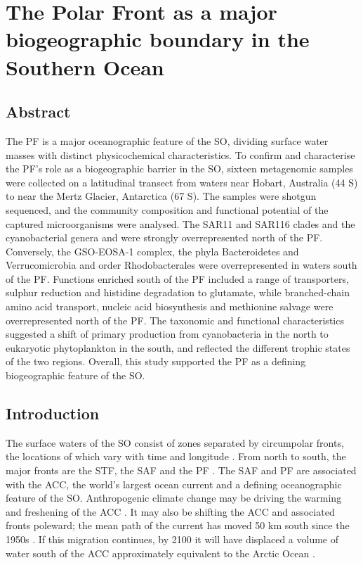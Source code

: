 \chapter[The Polar Front]{The Polar Front as a major biogeographic boundary in the Southern Ocean} 
\label{ch:polarfront}


\section{Abstract}

The \ac{PF} is a major oceanographic feature of the \ac{SO}, dividing surface water masses with distinct physicochemical characteristics.
To confirm and characterise the \ac{PF}'s role as a biogeographic barrier in the \ac{SO}, sixteen metagenomic samples were collected on a latitudinal transect from waters near Hobart, Australia (44\textdegree{} S) to near the Mertz Glacier, Antarctica (67\textdegree{} S).
The samples were shotgun sequenced, and the community composition and functional potential of the captured microorganisms were analysed.
The SAR11 and SAR116 clades and the cyanobacterial genera  and  were strongly overrepresented north of the \ac{PF}.
Conversely, the \ac{GSO-EOSA-1} complex, the phyla Bacteroidetes and Verrucomicrobia and order Rhodobacterales were overrepresented in waters south of the \ac{PF}. 
Functions enriched south of the \ac{PF} included a range of transporters, sulphur reduction and histidine degradation to glutamate, while branched-chain amino acid transport, nucleic acid biosynthesis and methionine salvage were overrepresented north of the \ac{PF}.
The taxonomic and functional characteristics suggested a shift of primary production from cyanobacteria in the north to eukaryotic phytoplankton in the south, and reflected the different trophic states of the two regions. 
Overall, this study supported the \ac{PF} as a defining biogeographic feature of the \ac{SO}.

\section{Introduction}

The surface waters of the \ac{SO} consist of zones separated by circumpolar fronts, the locations of which vary with time and longitude \cite{Whitworth:1980wo,Orsi:1995va,Sokolov:2002tc}.
From north to south, the major fronts are the \ac{STF}, the \ac{SAF} and the \ac{PF} .
The \ac{SAF} and \ac{PF} are associated with the \ac{ACC}, the world's largest ocean current and a defining oceanographic feature of the \ac{SO}.
Anthropogenic climate change may be driving the warming and freshening of the \ac{ACC} \cite{Boning:2008il}.
It may also be shifting the \ac{ACC} and associated fronts poleward; the mean path of the current has moved \textapprox{}50 km south since the 1950s \cite{Gille:2002fr}.
If this migration continues, by 2100 it will have displaced a volume of water south of the \ac{ACC} approximately equivalent to the Arctic Ocean \cite{Fyfe:2005vp}.

